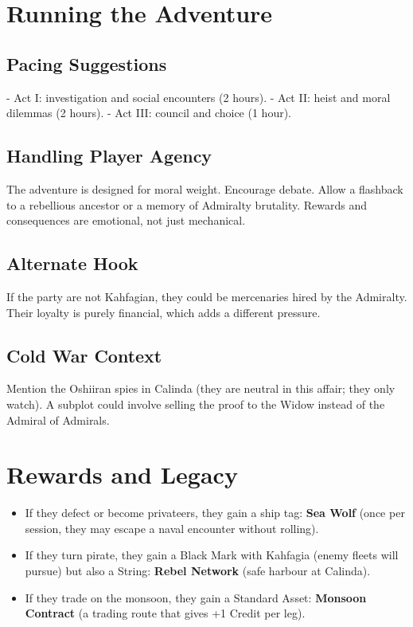 \documentclass[11pt]{article}
\begin{document}
\section{Running the Adventure}

\subsection{Pacing Suggestions}
- Act I: investigation and social encounters (2 hours).
- Act II: heist and moral dilemmas (2 hours).
- Act III: council and choice (1 hour).

\subsection{Handling Player Agency}
The adventure is designed for moral weight. Encourage debate. Allow a flashback to a rebellious ancestor or a memory of Admiralty brutality. Rewards and consequences are emotional, not just mechanical.

\subsection{Alternate Hook}
If the party are not Kahfagian, they could be mercenaries hired by the Admiralty. Their loyalty is purely financial, which adds a different pressure.

\subsection{Cold War Context}
Mention the Oshiiran spies in Calinda (they are neutral in this affair; they only watch). A subplot could involve selling the proof to the Widow instead of the Admiral of Admirals.

\section{Rewards and Legacy}

\begin{itemize}
    \item If they defect or become privateers, they gain a ship tag: \textbf{Sea Wolf} (once per session, they may escape a naval encounter without rolling).
    \item If they turn pirate, they gain a Black Mark with Kahfagia (enemy fleets will pursue) but also a String: \textbf{Rebel Network} (safe harbour at Calinda).
    \item If they trade on the monsoon, they gain a Standard Asset: \textbf{Monsoon Contract} (a trading route that gives +1 Credit per leg).
\end{itemize}
\end{document}
